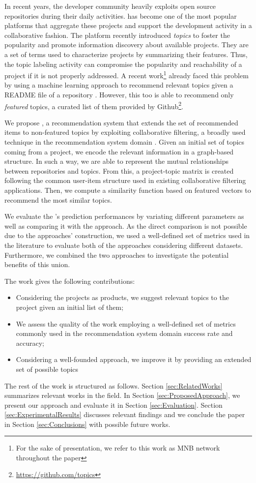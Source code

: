 In recent years, the developer community heavily exploits open source repositories during their daily activities. \GH has become one of the most
popular platforms that aggregate these projects and
support the development activity in a collaborative fashion.
%
The platform recently introduced \emph{topics} to foster the popularity and promote information discovery about available projects. They are a set of terms used to characterize projects by summarizing their features.  
Thus, the topic labeling activity can compromise the popularity and reachability of a project if it is not properly addressed. A recent work\footnote{For the sake of presentation, we refer to this work as MNB network throughout the paper} already faced this problem by using a machine learning approach to recommend relevant topics given a README file of a repository \cite{10.1145/3383219.3383227}. However, this too is able to recommend only \emph{featured} topics, a curated list of them provided by Github\footnote{\url{https://github.com/topics}}.
 
We propose \CT, a recommendation system that extends the set of recommended items to non-featured topics by exploiting collaborative filtering, a broadly used technique in the recommendation system domain \cite{Schafer:2007:CFR:1768197.1768208}. Given an initial set of topics coming from a \GH project, we encode the relevant information in a graph-based structure. In such a way, we are able to represent the mutual relationships between repositories and topics. From this, a project-topic matrix is created following the common user-item structure used in existing collaborative filtering applications. Then, we compute a similarity function based on featured vectors to recommend the most similar topics.

We evaluate the \CT's prediction performances by variating different parameters as well as comparing it with the \MNB approach. As the direct comparison is not possible due to the approaches' construction, we used a well-defined set of metrics used in the literature to evaluate both of the approaches considering different datasets. Furthermore, we combined the two approaches to investigate the potential benefits of this union. 

The work gives the following contributions:
\begin{itemize}
\item Considering the \GH projects as products, we suggest relevant topics to the project given an initial list of them;
\item We assess the quality of the work employing a well-defined set of metrics commonly used in the recommendation system domain \ie success rate and accuracy;
\item Considering a well-founded approach, we improve it by providing an extended set of possible topics  
\end{itemize}

The rest of the work is structured as follows. Section \ref{sec:RelatedWorks} summarizes relevant works in the field. In Section \ref{sec:ProposedApproach}, we present our approach and evaluate it in Section \ref{sec:Evaluation}. Section \ref{sec:ExperimentalResults} discusses relevant findings and we conclude the paper in Section \ref{sec:Conclusions} with possible future works.
